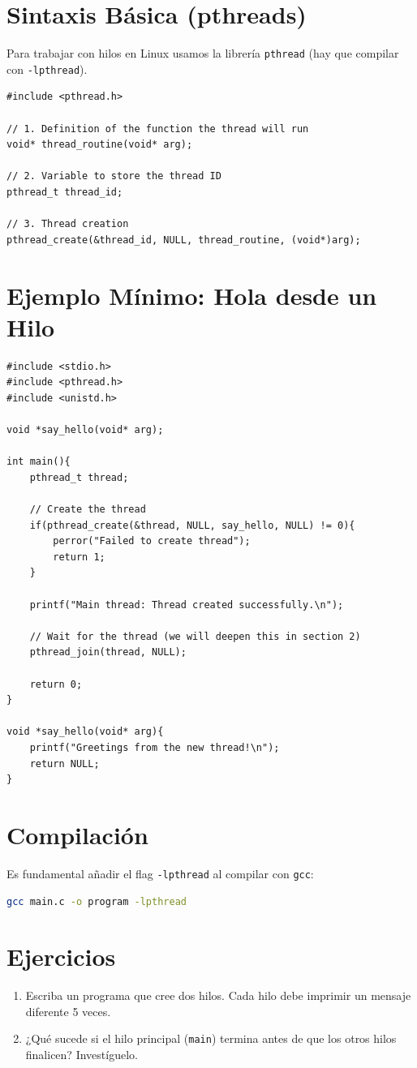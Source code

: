 \documentclass[12pt,a4paper]{article}
\begin{document}
\newpage

\section{Sintaxis Básica (pthreads)}
Para trabajar con hilos en Linux usamos la librería \texttt{pthread} (hay que compilar con \texttt{-lpthread}).

\begin{lstlisting}[numbers=none]
#include <pthread.h>

// 1. Definition of the function the thread will run
void* thread_routine(void* arg);

// 2. Variable to store the thread ID
pthread_t thread_id;

// 3. Thread creation
pthread_create(&thread_id, NULL, thread_routine, (void*)arg);
\end{lstlisting}

\section{Ejemplo Mínimo: Hola desde un Hilo}
\begin{lstlisting}
#include <stdio.h>
#include <pthread.h>
#include <unistd.h>

void *say_hello(void* arg);

int main(){
    pthread_t thread;

    // Create the thread
    if(pthread_create(&thread, NULL, say_hello, NULL) != 0){
        perror("Failed to create thread");
        return 1;
    }

    printf("Main thread: Thread created successfully.\n");
    
    // Wait for the thread (we will deepen this in section 2)
    pthread_join(thread, NULL); 

    return 0;
}

void *say_hello(void* arg){
    printf("Greetings from the new thread!\n");
    return NULL;
}

\end{lstlisting}

\section{Compilación}
Es fundamental añadir el flag \texttt{-lpthread} al compilar con \texttt{gcc}:
\begin{lstlisting}[language=bash, numbers=none]
gcc main.c -o program -lpthread
\end{lstlisting}

\section{Ejercicios}
\begin{enumerate}
    \item Escriba un programa que cree dos hilos. Cada hilo debe imprimir un mensaje diferente 5 veces.
    \item ¿Qué sucede si el hilo principal (\texttt{main}) termina antes de que los otros hilos finalicen? Investíguelo.
\end{enumerate}
\end{document}
